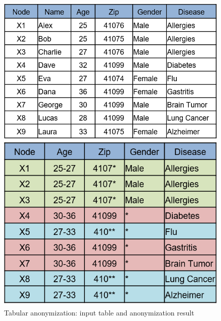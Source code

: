 \documentclass{llncs}
\begin{document}
\begin{figure}[H]
	\centering
	\begin{minipage}[b]{0.535\textwidth}
		\includegraphics[width=\textwidth]{figures/theory/k_anon_input}
	\end{minipage}
	\hfill
	\begin{minipage}[b]{0.448\textwidth}
		\includegraphics[width=\textwidth]{figures/theory/k_anon_output}
	\end{minipage}
	\caption{Tabular anonymization: input table and anonymization result}
	\label{fig:anonymized_clusters}
\end{figure}



\end{document}
